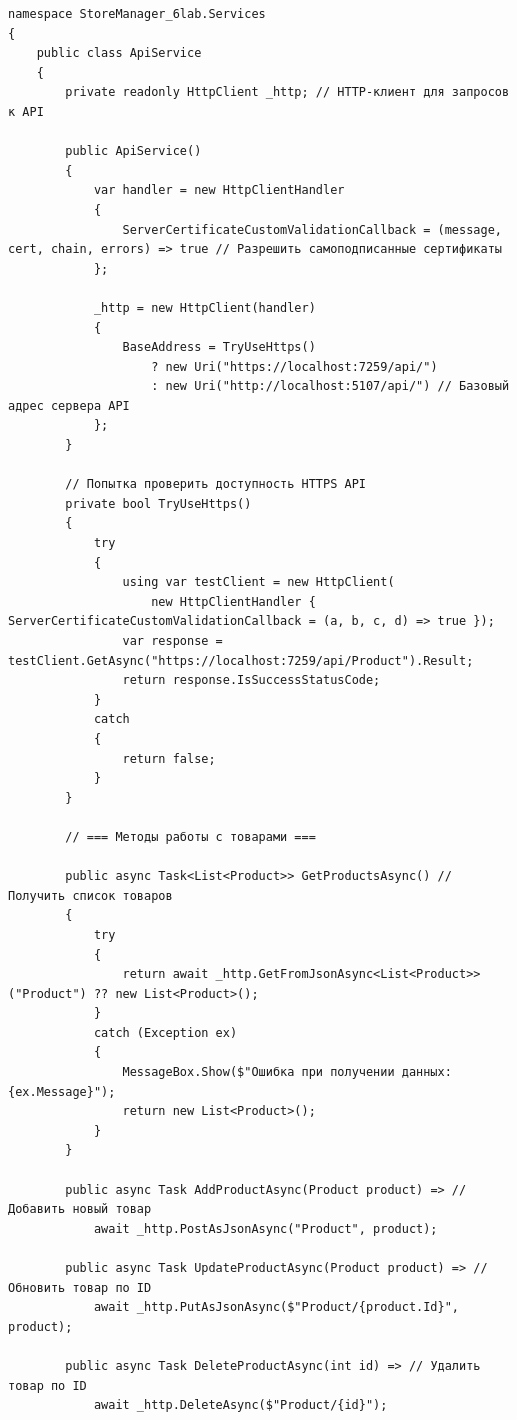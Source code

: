 \documentclass[12pt]{article}
\newenvironment{code}
  {\par\captionsetup{type=listing}\noindent}
  {\par\vspace{\baselineskip}}
\numberwithin{listing}{section}
\numberwithin{figure}{section}
\begin{document}
\begin{code}
	\begin{verbatim}
namespace StoreManager_6lab.Services
{
    public class ApiService
    {
        private readonly HttpClient _http; // HTTP-клиент для запросов к API

        public ApiService()
        {
            var handler = new HttpClientHandler
            {
                ServerCertificateCustomValidationCallback = (message, cert, chain, errors) => true // Разрешить самоподписанные сертификаты
            };

            _http = new HttpClient(handler)
            {
                BaseAddress = TryUseHttps()
                    ? new Uri("https://localhost:7259/api/")
                    : new Uri("http://localhost:5107/api/") // Базовый адрес сервера API
            };
        }

        // Попытка проверить доступность HTTPS API
        private bool TryUseHttps()
        {
            try
            {
                using var testClient = new HttpClient(
                    new HttpClientHandler { ServerCertificateCustomValidationCallback = (a, b, c, d) => true });
                var response = testClient.GetAsync("https://localhost:7259/api/Product").Result;
                return response.IsSuccessStatusCode;
            }
            catch
            {
                return false;
            }
        }

        // === Методы работы с товарами ===

        public async Task<List<Product>> GetProductsAsync() // Получить список товаров
        {
            try
            {
                return await _http.GetFromJsonAsync<List<Product>>("Product") ?? new List<Product>();
            }
            catch (Exception ex)
            {
                MessageBox.Show($"Ошибка при получении данных: {ex.Message}");
                return new List<Product>();
            }
        }

        public async Task AddProductAsync(Product product) => // Добавить новый товар
            await _http.PostAsJsonAsync("Product", product);

        public async Task UpdateProductAsync(Product product) => // Обновить товар по ID
            await _http.PutAsJsonAsync($"Product/{product.Id}", product);

        public async Task DeleteProductAsync(int id) => // Удалить товар по ID
            await _http.DeleteAsync($"Product/{id}");


\end{verbatim}
\end{code}
\end{document}
